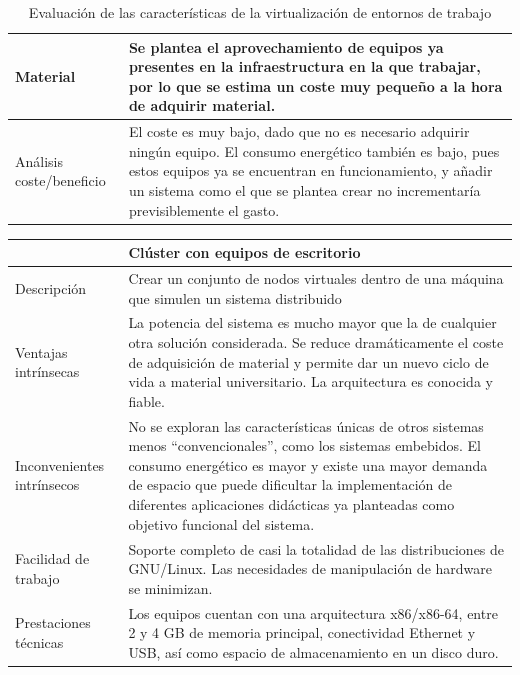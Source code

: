 \begin{table}[H]
\begin{tabular}{|p{2.4cm}|p{12cm}|}
\hline
Material&Se plantea el aprovechamiento de equipos ya presentes en la infraestructura en la que trabajar, por lo que se estima un coste muy pequeño a la hora de adquirir material.\\
\hline
Análisis coste/beneficio&El coste es muy bajo, dado que no es necesario adquirir ningún equipo. El consumo energético también es bajo, pues estos equipos ya se encuentran en funcionamiento, y añadir un sistema como el que se plantea crear no incrementaría previsiblemente el gasto.\\
\hline
\end{tabular}
\caption[Características de la virtualización de entornos de trabajo]{Evaluación de las características de la virtualización de entornos de trabajo}
\end{table}

\begin{table}[H]
\begin{tabular}{|p{2.4cm}|p{12cm}|}
\hline
&\textbf{Clúster con equipos de escritorio}\\
\hline
Descripción&Crear un conjunto de nodos virtuales dentro de una máquina que simulen un sistema distribuido\\
\hline
Ventajas intrínsecas&La potencia del sistema es mucho mayor que la de cualquier otra solución considerada. Se reduce dramáticamente el coste de adquisición de material y permite dar un nuevo ciclo de vida a material universitario. La arquitectura es conocida y fiable.\\
\hline
Inconvenientes intrínsecos&No se exploran las características únicas de otros sistemas menos ``convencionales'', como los sistemas embebidos. El consumo energético es mayor y existe una mayor demanda de espacio que puede dificultar la implementación de diferentes aplicaciones didácticas ya planteadas como objetivo funcional del sistema.
\\
\hline
Facilidad de trabajo&Soporte completo de casi la totalidad de las distribuciones de GNU/Linux. Las necesidades de manipulación de hardware se minimizan.\\
\hline
Prestaciones técnicas&Los equipos cuentan con una arquitectura x86/x86-64, entre 2 y 4 GB de memoria principal, conectividad Ethernet y USB, así como espacio de almacenamiento en un disco duro. 

\end{tabular}
\end{table}
